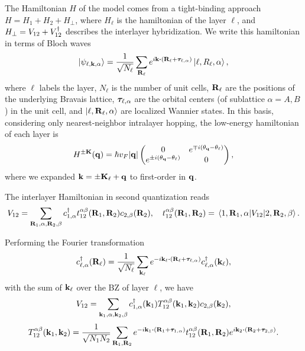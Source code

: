 \documentclass[12pt]{report}
\begin{document}
\n

The Hamiltonian $H$ of the model comes from a tight-binding approach $H = H_1 + H_2 + H_{\perp}$, where $H_\ell$ is the hamiltonian of the layer $\ell$, and $H_\perp = V_{12} + V_{12}^\dagger$ describes the interlayer hybridization. We write this hamiltonian in terms of Bloch waves
\begin{equation} \label{eq:BM-blochwave}
\ket{\psi_{\ell, \k, \alpha}} = \frac{1}{\sqrt{N_\ell}} \sum_{\R_\ell} e^{i \k \vdot (\R_\ell + \vtau_{\ell,\alpha})} \ket{\ell, R_\ell, \alpha},
\end{equation}
where $\ell$ labels the layer, $N_\ell$ is the number of unit cells, $\vb{R}_\ell$ are the positions of the underlying Bravais lattice, ${\bm{\tau}}_{\ell,\alpha}$ are the orbital centers (of sublattice $\alpha = A,B$) in the unit cell, and $\ket{\ell,\vb{R}_\ell,\alpha}$ are localized Wannier states. In this basis, considering only nearest-neighbor intralayer hopping, the low-energy hamiltonian of each layer is
\begin{equation} \label{eq:blg-eachlayer-hamil-lowenergy}
H^{\pm \vb{K}}({\vb{q}}) = \hbar v_F \abs{{\vb{q}}}
\begin{pmatrix}
0 & e^{\mp i (\theta_{\vb{q}} - \theta_\ell)} \\
e^{\pm i (\theta_{\vb{q}} - \theta_\ell)} & 0
\end{pmatrix},
\end{equation}
where we expanded ${\vb{k}} = \pm \vb{K}_\ell + {\vb{q}}$ to first-order in ${\vb{q}}$.

\n

The interlayer Hamiltonian in second quantization reads
\begin{equation} \label{eq:interlayer-hopping}
V_{12} = \sum_{\vb{R}_1,\alpha,\vb{R}_2,\beta} c_{1,\alpha}^\dagger t_{12}^{\alpha\beta}(\vb{R}_1,\vb{R}_2) c_{2,\beta}(\vb{R}_2), \quad
t_{12}^{\alpha\beta}(\vb{R}_1,\vb{R}_2) =
\mel{1,\vb{R}_1,\alpha}{V_{12}}{2,\vb{R}_2,\beta}.
\end{equation}

Performing the Fourier transformation
\begin{equation} \label{eq:blg-fourier}
c_{\ell,\alpha}^\d(\R_\ell) = \frac{1}{\sqrt{N_\ell}} \sum_{\k_\ell}
e^{-i\k_\ell \vdot (\R_\ell + \vtau_{\ell,\alpha})} c_{\ell,\alpha}^\d(\k_\ell),
\end{equation}
with the sum of ${\vb{k}}_\ell$ over the BZ of layer $\ell$, we have
\begin{equation} \label{eq:interlayer-hopping-kspace}
V_{12} = \sum_{{\vb{k}}_1,\alpha,{\vb{k}}_2,\beta} c_{1,\alpha}^\dagger({\vb{k}}_1) T_{12}^{\alpha\beta}({\vb{k}}_1,{\vb{k}}_2) c_{2,\beta}({\vb{k}}_2),
\end{equation}
\begin{equation} \label{eq:interlayer-hopping-Tkspace}
T_{12}^{\alpha\beta}(\k_1,\k_2) =
\frac{1}{\sqrt{N_1 N_2}} \sum_{\R_1,\R_2} e^{-i\k_1\vdot(\R_1+\vtau_{1,\alpha})}
t_{12}^{\alpha\beta}(\R_1,\R_2) e^{i\k_2\vdot(\R_2+\vtau_{2,\beta})}.
\end{equation}
\end{document}
